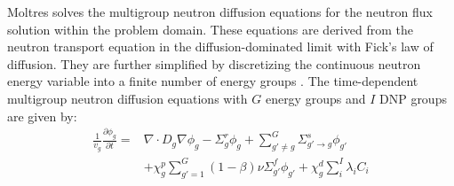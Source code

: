 Moltres solves the multigroup neutron diffusion equations for the neutron
flux solution within the problem domain. These equations are derived from the
neutron transport equation in the diffusion-dominated limit with Fick's law of
diffusion. They are further simplified by discretizing the continuous neutron energy
variable into a finite number of energy groups \cite{bell_nuclear_1970,
duderstadt_nuclear_1976}. The time-dependent multigroup neutron
diffusion equations with $G$ energy groups and $I$ \gls{DNP}
groups are given by:
%
\begin{align}
    \frac{1}{v_g} \frac{\partial \phi_g}{\partial t} =& \nabla \cdot D_g
    \nabla \phi_g - \Sigma^r_g \phi_g +
    \sum^G_{g' \neq g} \Sigma^s_{g' \rightarrow g} \phi_{g'} \nonumber \\
    &+ \chi^p_g \sum^G_{g'=1} \left( 1-\beta \right) \nu \Sigma^f_{g'}
    \phi_{g'} + \chi^d_g \sum^I_i \lambda_i C_i \label{eq:neutron} %
\end{align}

